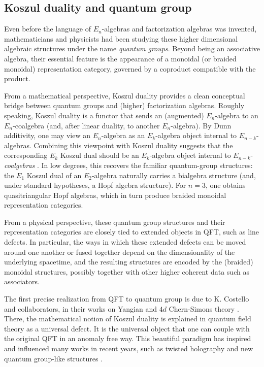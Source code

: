 \documentclass[11pt]{article}
\numberwithin{equation}{section}
\begin{document}
\subsection{Koszul duality and quantum group}
Even before the language of $E_n$-algebras and factorization algebras was invented, mathematicians and physicists had been studying these higher dimensional algebraic structures under the name \emph{quantum groups}. Beyond being an associative algebra, their essential feature is the appearance of a monoidal (or braided monoidal) representation category, governed by a coproduct compatible with the product. 

From a mathematical perspective, Koszul duality provides a clean conceptual bridge between quantum groups and (higher) factorization algebras. Roughly speaking, Koszul duality is a functor that sends an (augmented) $E_n$-algebra to an $E_n$-coalgebra (and, after linear duality, to another $E_n$-algebra). By Dunn additivity, one may view an $E_n$-algebra as an $E_k$-algebra object internal to $E_{n-k}$-algebras. Combining this viewpoint with Koszul duality suggests that the corresponding $E_k$ Koszul dual should be an $E_k$-algebra object internal to $E_{n-k}$-\emph{coalgebras} \cite{ginot2012higher}. In low degrees, this recovers the familiar quantum-group structures: the $E_1$ Koszul dual of an $E_2$-algebra naturally carries a bialgebra structure (and, under standard hypotheses, a Hopf algebra structure). For $n=3$, one obtains quasitriangular Hopf algebras, which in turn produce braided monoidal representation categories.

From a physical perspective, these quantum group structures and their representation categories are closely tied to extended objects in QFT, such as line defects. In particular, the ways in which these extended defects can be moved around one another or fused together depend on the dimensionality of the underlying spacetime, and the resulting structures are encoded by the (braided) monoidal structures, possibly together with other higher coherent data such as associators. 

The first precise realization from QFT to quantum group is due to K. Costello and collaborators, in their works on Yangian and $4d$ Chern-Simons theory \cite{Costello:2013zra,Costello:2017dso}. There, the mathematical notion of Koszul duality is explained in quantum field theory as a universal defect. It is the universal object that one can couple with the original QFT in an anomaly free way. This beautiful paradigm has inspired and influenced many works in recent years, such as twisted holography \cite{Costello:2016mgj,Costello:2017fbo,Costello:2018zrm} and new quantum group-like structures \cite{dimofte2025line}.
 
\end{document}
